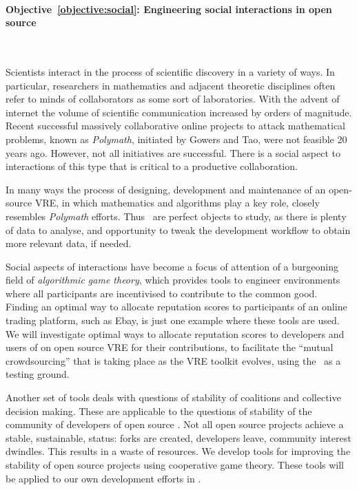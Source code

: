 \documentclass[noworkareas,deliverables,\classoptions]{euproposal}       %
\begin{document}
\begin{proposal}
\paragraph{Objective~\ref{objective:social}: Engineering social
  interactions in open source \VREs}\ 

Scientists interact in the process of scientific discovery in a
variety of ways.  In particular, researchers in mathematics and
adjacent theoretic disciplines often refer to minds of collaborators
as some sort of laboratories. With the advent of internet the volume
of scientific communication increased by orders of magnitude. Recent
successful massively collaborative online projects to attack
mathematical problems, known as \emph{Polymath}, initiated by Gowers
and Tao, were not feasible 20 years ago. However, not all initiatives
are successful. There is a social aspect to interactions of this type
that is critical to a productive collaboration.

In many ways the process of designing, development and maintenance of
an open-source VRE, in which mathematics and algorithms play a key
role, closely resembles \emph{Polymath} efforts.  Thus \TheProject\
\VREs are perfect objects to study, as there is plenty of data to
analyse, and opportunity to tweak the development workflow to obtain
more relevant data, if needed.

Social aspects of interactions have become a focus of attention of a
burgeoning field of \emph{algorithmic game theory}, which provides
tools to engineer environments where all participants are incentivised
to contribute to the common good.  Finding an optimal way to allocate
reputation scores to participants of an online trading platform, such
as Ebay, is just one example where these tools are used. We will
investigate optimal ways to allocate reputation scores to developers
and users of on open source VRE for their contributions, to facilitate
the ``mutual crowdsourcing'' that is taking place as the VRE toolkit
evolves, using the \TheProject\ \VREs as a testing ground.

Another set of tools deals with questions of stability of coalitions
and collective decision making.  These are applicable to the questions
of stability of the community of developers of open source \VREs. Not
all open source projects achieve a stable, sustainable, status: forks
are created, developers leave, community interest dwindles. This
results in a waste of resources.  We develop tools for improving the
stability of open source projects using cooperative game theory. These
tools will be applied to our own development efforts in \TheProject
\VREs.



\end{proposal}
\end{document}
